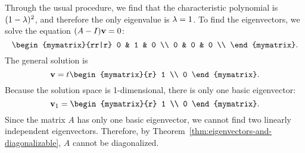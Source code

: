 \begin{solution}
  Through the usual procedure, we find that the characteristic
  polynomial is $(1-\lambda)^2$, and therefore the only eigenvalue is
  $\lambda=1$. To find the eigenvectors, we solve the equation
  $(A-I)\mbox{\bf v} = 0$:
  \begin{equation*}
    \begin{mymatrix}{rr|r}
      0 & 1 & 0 \\
      0 & 0 & 0 \\
    \end{mymatrix}.
  \end{equation*}
  The general solution is 
  \begin{equation*}
    \vect{v} = t\begin{mymatrix}{r} 1 \\ 0 \end{mymatrix}.
  \end{equation*}
  Because the solution space is 1-dimensional, there is only one basic
  eigenvector:
  \begin{equation*}
    \vect{v}_1 = \begin{mymatrix}{r} 1 \\ 0 \end{mymatrix}.
  \end{equation*}
  Since the matrix $A$ has only one basic eigenvector, we cannot find
  two linearly independent eigenvectors. Therefore, by
  Theorem~\ref{thm:eigenvectors-and-diagonalizable}, $A$ cannot be
  diagonalized. 
\end{solution}
